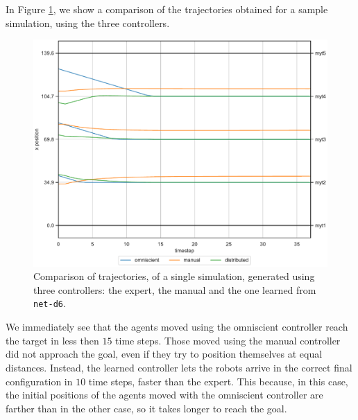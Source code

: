 In Figure \ref{fig:net-d6traj1}, we show a comparison of the trajectories obtained 
for a sample simulation, using the three controllers.
\begin{figure}[!htb]
	\centering
	\includegraphics[width=.7\textwidth]{contents/images/net-d6/animation-distributed1}%
	\caption[Evaluation of the trajectories obtained with \texttt{prox\_comm} 
	input.]{Comparison of trajectories, of a single simulation, generated using three 
		controllers: the expert, the manual and the one learned from \texttt{net-d6}.}
	\label{fig:net-d6traj1}
\end{figure}  
We immediately see that the agents moved using the omniscient controller 
reach the target in less then $15$ time steps. Those moved using the manual 
controller did not approach the goal, even if they try to position themselves at 
equal distances. Instead, the learned controller lets the robots arrive in the 
correct final configuration in $10$ time steps, faster than the expert. This 
because, in this case, the initial positions of the agents moved with the omniscient 
controller are farther than in the other case, so it takes longer to reach the goal.

